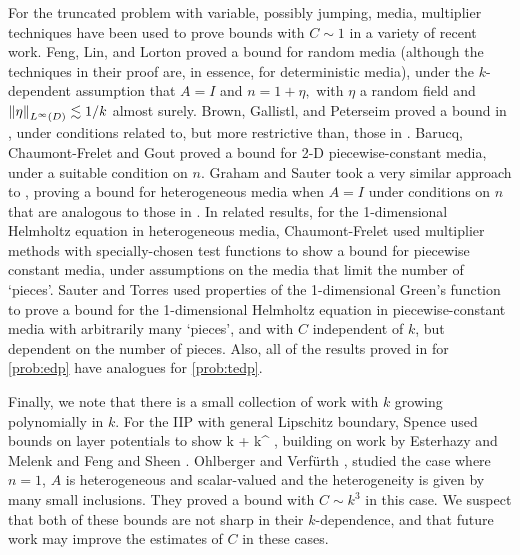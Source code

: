 For the truncated problem with variable, possibly jumping, media, multiplier techniques have been used to prove bounds with $C \sim 1$ in a variety of recent work. Feng, Lin, and Lorton \cite{FeLiLo:15} proved a bound for random media (although the techniques in their proof are, in essence, for deterministic media), under the $k$-dependent assumption that $A=I$ and $n = 1 + \eta,$ with $\eta$ a random field and $\NLiD{\eta} \lesssim 1/k$ almost surely. Brown, Gallistl, and Peterseim proved a bound in \cite{BrGaPe:17}, under conditions related to, but more restrictive than, those in \cite{GrPeSp:19}. Barucq, Chaumont-Frelet and Gout \cite{BaChGo:17} proved a bound for 2-D piecewise-constant media, under a suitable condition on $n$. Graham and Sauter \cite{GrSa:18} took a very similar approach to \cite{GrPeSp:19}, proving a bound for heterogeneous media when $A=I$ under conditions on $n$ that are analogous to those in \cite{GrPeSp:19}. In related results, for the 1-dimensional Helmholtz equation in heterogeneous media, Chaumont-Frelet \cite[Section 2.1.5, Theorem 3]{Ch:15} used multiplier methods with specially-chosen test functions to show a bound for piecewise constant media, under assumptions on the media that limit the number of `pieces'. Sauter and Torres \cite{SaTo:18} used properties of the 1-dimensional Green's function to prove a bound for the 1-dimensional Helmholtz equation in piecewise-constant media with arbitrarily many `pieces', and with $C$ independent of $k$, but dependent on the number of pieces. Also, all of the results proved in \cite{GrPeSp:19} for \cref{prob:edp} have analogues for \cref{prob:tedp}.

Finally, we note that there is a small collection of work with $k$ growing polynomially in $k$. For the IIP with general Lipschitz boundary, Spence \cite{Sp:14} used bounds on layer potentials to show
\beqs
{} \lesssim k  + k^{\half} \NLtGI{\gI},
\eeqs
building on work by Esterhazy and Melenk \cite{EsMe:12} and Feng and Sheen \cite{FeSh:94}. Ohlberger and Verf\"urth \cite{OhVe:18}, studied the case where $n=1$, $A$ is heterogeneous and scalar-valued and the heterogeneity is given by many small inclusions. They proved a bound with $C \sim k^3$ in this case. We suspect that both of these bounds are not sharp in their $k$-dependence, and that future work may improve the estimates of $C$ in these cases.

